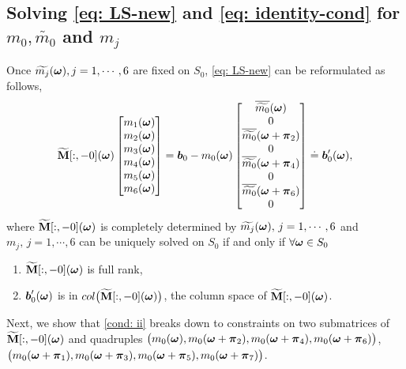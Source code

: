 \subsection{Solving \eqref{eq: LS-new} and \eqref{eq: identity-cond} for $m_0,\widetilde{m_0}$ and $m_j$}\label{subsec: compute-m0}
Once $\widetilde{m_{j}}(\boldsymbol{\omega}), j= 1,\cdots, 6$ are fixed on $S_0$, \eqref{eq: LS-new} can be reformulated as follows,
\begin{align}\label{eq: mj-eq}
\widetilde{\mathbf{M}}[:,-0](\boldsymbol{\omega}) 
\begin{bmatrix}
m_1(\boldsymbol{\omega})\\
m_2(\boldsymbol{\omega})\\
m_3(\boldsymbol{\omega})\\
m_4(\boldsymbol{\omega})\\
m_5(\boldsymbol{\omega})\\
m_6(\boldsymbol{\omega})
\end{bmatrix}
= \boldsymbol{b}_0 - m_0(\boldsymbol{\omega})
\begin{bmatrix}
 \overline{\widetilde{m_0}}(\boldsymbol{\omega})\\
 0\\
\overline{\widetilde{m_{0}}}(\boldsymbol{\omega} + \boldsymbol{\pi}_{2})\\
0\\
\overline{\widetilde{m_{0}}}(\boldsymbol{\omega} + \boldsymbol{\pi}_{4})\\
0\\
\overline{\widetilde{m_{0}}}(\boldsymbol{\omega} + \boldsymbol{\pi}_{6})\\
0
\end{bmatrix} \doteq \boldsymbol{b}_0'(\boldsymbol{\omega}),
\end{align}
where $\widetilde{\mathbf{M}}[:,-0](\boldsymbol{\omega})$ is completely determined by $\widetilde{m_{j}}(\boldsymbol{\omega}),\,j = 1,\cdots,6$ 
and $m_j,\,j=1,\cdots,6$ can be uniquely solved on $S_0$ if and only if $\forall\boldsymbol{\omega}\in S_0$
\hspace{-1em}
\begin{enumerate}[leftmargin=.5in]
\item[\mylabel{cond: i}{(\ref{subsec: compute-m0}.i)}] $\widetilde{\mathbf{M}}[:,-0](\boldsymbol{\omega})$ is full rank,%
\item[\mylabel{cond: ii}{(\ref{subsec: compute-m0}.ii)}] $\boldsymbol{b}_0'(\boldsymbol{\omega})$ is in $col\big(\widetilde{\mathbf{M}}[:,-0](\boldsymbol{\omega})\big)$, the column space of $\widetilde{\mathbf{M}}[:,-0](\boldsymbol{\omega})$.%
\end{enumerate}
Next, we show that \ref{cond: ii} breaks down to constraints on two submatrices of $\widetilde{\mathbf{M}}[:,-0](\boldsymbol{\omega})$ and quadruples $\big( m_0(\boldsymbol{\omega}),m_0(\boldsymbol{\omega}+\boldsymbol{\pi}_2), m_0(\boldsymbol{\omega} +\boldsymbol{\pi}_4), m_0(\boldsymbol{\omega}+\boldsymbol{\pi}_6) \big)$, $\big( m_0(\boldsymbol{\omega}+\boldsymbol{\pi}_1),m_0(\boldsymbol{\omega}+\boldsymbol{\pi}_3), m_0(\boldsymbol{\omega} +\boldsymbol{\pi}_5), m_0(\boldsymbol{\omega}+\boldsymbol{\pi}_7) \big)$.
